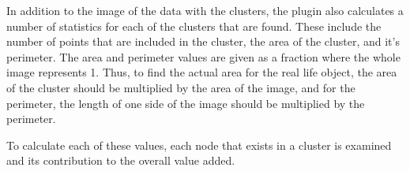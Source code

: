 In addition to the image of the data with the clusters, the plugin also
calculates a number of statistics for each of the clusters that are found.
These include the number of points that are included in the cluster, the area
of the cluster, and it's perimeter. The area and perimeter values are given as
a fraction where the whole image represents 1. Thus, to find the actual area
for the real life object, the area of the cluster should be multiplied by the
area of the image, and for the perimeter, the length of one side of the image
should be multiplied by the perimeter.

To calculate each of these values, each node that exists in a cluster is
examined and its contribution to the overall value added.

